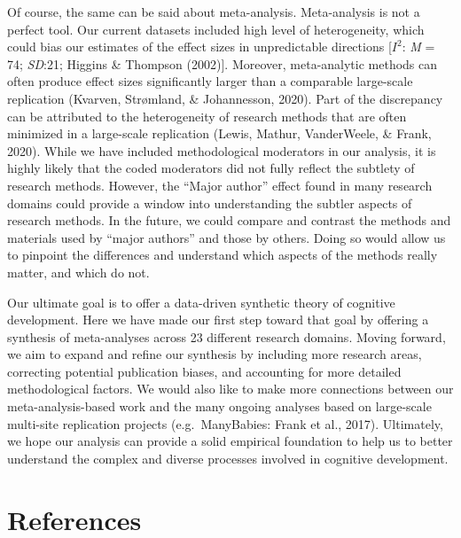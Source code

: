 \documentclass[10pt, letterpaper]{article}
\begin{document}
Of course, the same can be said about meta-analysis. Meta-analysis is
not a perfect tool. Our current datasets included high level of
heterogeneity, which could bias our estimates of the effect sizes in
unpredictable directions {[}\(I^2\): \emph{M} = 74; \emph{SD}:21;
Higgins \& Thompson (2002){]}. Moreover, meta-analytic methods can often
produce effect sizes significantly larger than a comparable large-scale
replication (Kvarven, Strømland, \& Johannesson, 2020). Part of the
discrepancy can be attributed to the heterogeneity of research methods
that are often minimized in a large-scale replication (Lewis, Mathur,
VanderWeele, \& Frank, 2020). While we have included methodological
moderators in our analysis, it is highly likely that the coded
moderators did not fully reflect the subtlety of research methods.
However, the ``Major author'' effect found in many research domains
could provide a window into understanding the subtler aspects of
research methods. In the future, we could compare and contrast the
methods and materials used by ``major authors'' and those by others.
Doing so would allow us to pinpoint the differences and understand which
aspects of the methods really matter, and which do not.

Our ultimate goal is to offer a data-driven synthetic theory of
cognitive development. Here we have made our first step toward that goal
by offering a synthesis of meta-analyses across 23 different research
domains. Moving forward, we aim to expand and refine our synthesis by
including more research areas, correcting potential publication biases,
and accounting for more detailed methodological factors. We would also
like to make more connections between our meta-analysis-based work and
the many ongoing analyses based on large-scale multi-site replication
projects (e.g.~ManyBabies: Frank et al., 2017). Ultimately, we hope our
analysis can provide a solid empirical foundation to help us to better
understand the complex and diverse processes involved in cognitive
development.

\hypertarget{references}{%
\section{References}\label{references}}

\setlength{\parindent}{-0.1in} 
\setlength{\leftskip}{0.125in}

\noindent
\end{document}
